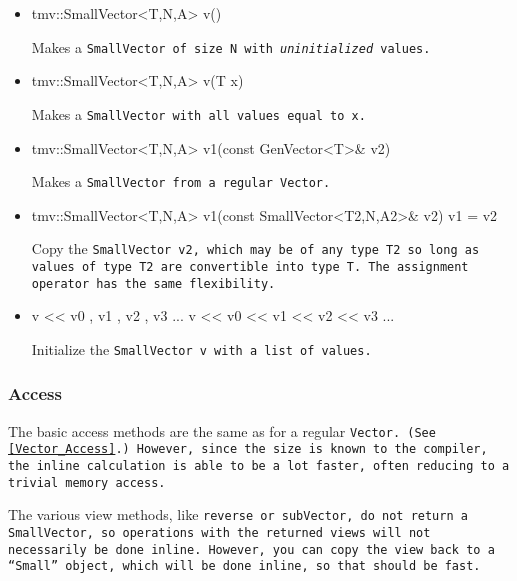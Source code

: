 \begin{itemize}
\item 
\begin{tmvcode}
tmv::SmallVector<T,N,A> v()
\end{tmvcode}
Makes a \tt{SmallVector} of size \tt{N}
with {\em uninitialized} values.

\item
\begin{tmvcode}
tmv::SmallVector<T,N,A> v(T x)
\end{tmvcode}
Makes a \tt{SmallVector} with all values equal to \tt{x}.

\item 
\begin{tmvcode}
tmv::SmallVector<T,N,A> v1(const GenVector<T>& v2)
\end{tmvcode}
Makes a \tt{SmallVector} from a regular \tt{Vector}.

\item
\begin{tmvcode}
tmv::SmallVector<T,N,A> v1(const SmallVector<T2,N,A2>& v2)
v1 = v2
\end{tmvcode}
Copy the \tt{SmallVector v2}, which may be of any type \tt{T2} so long
as values of type \tt{T2} are convertible into type \tt{T}.
The assignment operator has the same flexibility.

\item
\begin{tmvcode}
v << v0 , v1 , v2 , v3 ...
v << v0 << v1 << v2 << v3 ...
\end{tmvcode}
Initialize the \tt{SmallVector v} with a list of values.

\end{itemize}

\subsubsection{Access}
\label{SmallVector_Access}

The basic access methods are the same as for a regular \tt{Vector}.
(See \ref{Vector_Access}.)
However, since the size is known to the compiler, the inline calculation is able
to be a lot faster, often reducing to a trivial memory access.

The various view methods, like \tt{reverse} or \tt{subVector},
do not return a \tt{SmallVector}, so operations 
with the returned views will not necessarily be done inline.
However, you can copy the view back to a ``\tt{Small}'' object, which will be done 
inline, so that should be fast.

